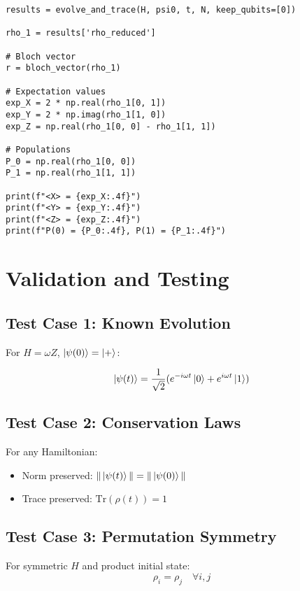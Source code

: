 \documentclass[11pt,a4paper]{article}
\begin{document}
\begin{lstlisting}
results = evolve_and_trace(H, psi0, t, N, keep_qubits=[0])

rho_1 = results['rho_reduced']

# Bloch vector
r = bloch_vector(rho_1)

# Expectation values
exp_X = 2 * np.real(rho_1[0, 1])
exp_Y = 2 * np.imag(rho_1[1, 0])
exp_Z = np.real(rho_1[0, 0] - rho_1[1, 1])

# Populations
P_0 = np.real(rho_1[0, 0])
P_1 = np.real(rho_1[1, 1])

print(f"<X> = {exp_X:.4f}")
print(f"<Y> = {exp_Y:.4f}")
print(f"<Z> = {exp_Z:.4f}")
print(f"P(0) = {P_0:.4f}, P(1) = {P_1:.4f}")
\end{lstlisting}

\section{Validation and Testing}

\subsection{Test Case 1: Known Evolution}

For $H = \omega Z$, $\ket{\psi(0)} = \ket{+}$:

\begin{equation}
    \ket{\psi(t)} = \frac{1}{\sqrt{2}}(e^{-i\omega t}\ket{0} + e^{i\omega t}\ket{1})
\end{equation}

\subsection{Test Case 2: Conservation Laws}

For any Hamiltonian:
\begin{itemize}
    \item Norm preserved: $\|\ket{\psi(t)}\| = \|\ket{\psi(0)}\|$
    \item Trace preserved: $\text{Tr}(\rho(t)) = 1$
\end{itemize}

\subsection{Test Case 3: Permutation Symmetry}

For symmetric $H$ and product initial state:
\begin{equation}
    \rho_i = \rho_j \quad \forall i, j
\end{equation}
\end{document}

